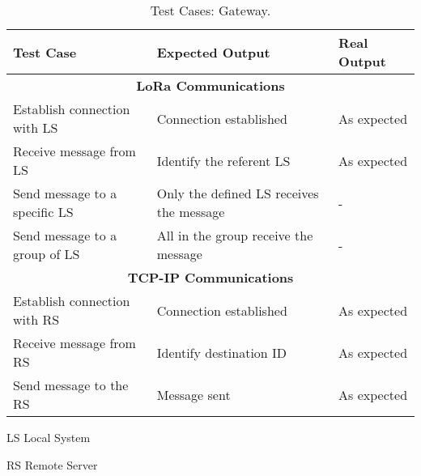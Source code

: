 \begin{table}[H]
	\centering
	\begin{threeparttable}
	\resizebox{\columnwidth}{!}
	{
		\begin{tabular}{|m{4cm}|m{5cm}||m{5cm}|}
			\hline
			\textbf{Test Case} & \textbf{Expected Output} & \textbf{Real Output}
			\\\hline\hline
			\multicolumn{3}{c}{\textbf{LoRa Communications}}\\\hline
			Establish connection with LS & Connection established & As expected
			\\\hline
			Receive message from LS & Identify the referent LS & As expected
			\\\hline
			Send message to a specific LS & Only the defined LS receives the message & -
			\\\hline
			Send message to a group of LS & All in the group receive the message & - 
			\\\hline
			
			\multicolumn{3}{c}{\textbf{TCP-IP Communications}}\\\hline
			Establish connection with RS & Connection established & As expected
			\\\hline
			Receive message from RS & Identify destination ID & As expected
			\\\hline
			Send message to the RS & Message sent & As expected
			\\\hline
		\end{tabular}
	}
	\begin{tablenotes}
		\small
		\item[LS]Local System
		\item[RS]Remote Server
	\end{tablenotes}
	
\end{threeparttable}	
	\caption{Test Cases: Gateway.}
	\label{table:test_gateway}
\end{table}
